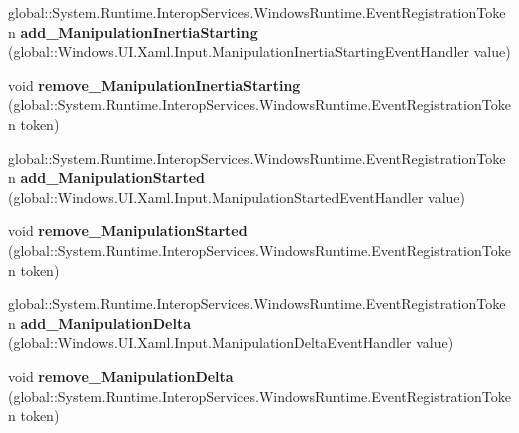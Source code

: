 \begin{DoxyCompactItemize}
global\+::\+System.\+Runtime.\+Interop\+Services.\+Windows\+Runtime.\+Event\+Registration\+Token {\bfseries add\+\_\+\+Manipulation\+Inertia\+Starting} (global\+::\+Windows.\+U\+I.\+Xaml.\+Input.\+Manipulation\+Inertia\+Starting\+Event\+Handler value)
\item 
\mbox{\label{interface_windows_1_1_u_i_1_1_xaml_1_1_i_u_i_element_a45e976afe0af013e41228cbdbdf558d2}} 
void {\bfseries remove\+\_\+\+Manipulation\+Inertia\+Starting} (global\+::\+System.\+Runtime.\+Interop\+Services.\+Windows\+Runtime.\+Event\+Registration\+Token token)
\item 
\mbox{\label{interface_windows_1_1_u_i_1_1_xaml_1_1_i_u_i_element_a0a6629935ddc66f152be79ea1665fe62}} 
global\+::\+System.\+Runtime.\+Interop\+Services.\+Windows\+Runtime.\+Event\+Registration\+Token {\bfseries add\+\_\+\+Manipulation\+Started} (global\+::\+Windows.\+U\+I.\+Xaml.\+Input.\+Manipulation\+Started\+Event\+Handler value)
\item 
\mbox{\label{interface_windows_1_1_u_i_1_1_xaml_1_1_i_u_i_element_a474a76e685a8b1af9722e5560b7d4c12}} 
void {\bfseries remove\+\_\+\+Manipulation\+Started} (global\+::\+System.\+Runtime.\+Interop\+Services.\+Windows\+Runtime.\+Event\+Registration\+Token token)
\item 
\mbox{\label{interface_windows_1_1_u_i_1_1_xaml_1_1_i_u_i_element_a478e7f65d80dfe362a865349005a2475}} 
global\+::\+System.\+Runtime.\+Interop\+Services.\+Windows\+Runtime.\+Event\+Registration\+Token {\bfseries add\+\_\+\+Manipulation\+Delta} (global\+::\+Windows.\+U\+I.\+Xaml.\+Input.\+Manipulation\+Delta\+Event\+Handler value)
\item 
\mbox{\label{interface_windows_1_1_u_i_1_1_xaml_1_1_i_u_i_element_a6abde84051b66829e30ea77484453f4f}} 
void {\bfseries remove\+\_\+\+Manipulation\+Delta} (global\+::\+System.\+Runtime.\+Interop\+Services.\+Windows\+Runtime.\+Event\+Registration\+Token token)
\item 
\mbox{\label{interface_windows_1_1_u_i_1_1_xaml_1_1_i_u_i_element_a359638bee7a6419a6b037cbd2981ae94}} 

\end{DoxyCompactItemize}
